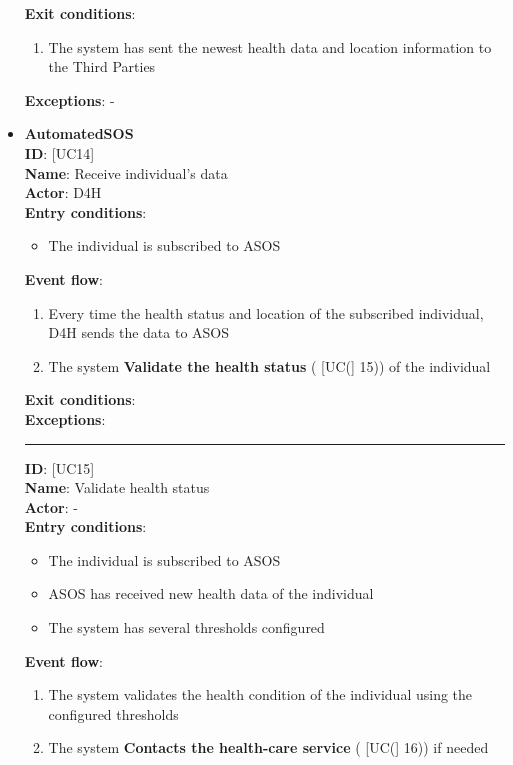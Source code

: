 \documentclass[a4paper, hidelinks, 12pt]{report}
\newcommand\usecase[1]{ [UC#1] }
\begin{document}
\begin{itemize}
\begin{enumerate}
		\end{enumerate}
		\textbf{Exit conditions}:
		\begin{enumerate}
			\item{The system has sent the newest health data and location information to the Third Parties}
		\end{enumerate}
		\textbf{Exceptions}: -
		\item{\textbf{AutomatedSOS}}\\
		\textbf{ID}: \usecase{14} \\
		\textbf{Name}: Receive individual's data \\
		\textbf{Actor}: D4H \\
		\textbf{Entry conditions}:
		\begin{itemize}
			\item{The individual is subscribed to ASOS}
		\end{itemize}
		\textbf{Event flow}:
		\begin{enumerate}
			\item{Every time the health status and location of the subscribed individual, D4H sends the data to ASOS}
			\item{The system \textbf{Validate the health status} (\usecase(15)) of the individual}
		\end{enumerate}
		\textbf{Exit conditions}: \\
		\textbf{Exceptions}: \\
		\rule{\linewidth}{0.4pt}
		\textbf{ID}: \usecase{15} \\
		\textbf{Name}: Validate health status \\
		\textbf{Actor}: - \\
		\textbf{Entry conditions}:
		\begin{itemize}
			\item{The individual is subscribed to ASOS}
			\item{ASOS has received new health data of the individual}
			\item{The system has several thresholds configured}
		\end{itemize}
		\textbf{Event flow}:
		\begin{enumerate}
			\item{The system validates the health condition of the individual using the configured thresholds}
			\item{The system \textbf{Contacts the health-care service} (\usecase(16)) if needed}

\end{enumerate}
\end{itemize}
\end{document}
